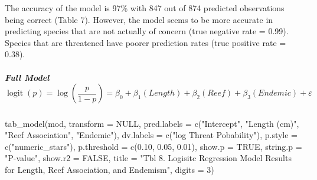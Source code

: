 \documentclass[
  letterpaper,
  DIV=11,
  numbers=noendperiod]{scrartcl}
\let\oldsubparagraph\subparagraph
\renewcommand{\subparagraph}[1]{\oldsubparagraph{#1}\mbox{}}
\newenvironment{Shaded}{\begin{snugshade}}{\end{snugshade}}
\newcommand{\AttributeTok}[1]{\textcolor[rgb]{0.40,0.45,0.13}{#1}}
\newcommand{\ConstantTok}[1]{\textcolor[rgb]{0.56,0.35,0.01}{#1}}
\newcommand{\DecValTok}[1]{\textcolor[rgb]{0.68,0.00,0.00}{#1}}
\newcommand{\FloatTok}[1]{\textcolor[rgb]{0.68,0.00,0.00}{#1}}
\newcommand{\FunctionTok}[1]{\textcolor[rgb]{0.28,0.35,0.67}{#1}}
\newcommand{\NormalTok}[1]{\textcolor[rgb]{0.00,0.23,0.31}{#1}}
\newcommand{\StringTok}[1]{\textcolor[rgb]{0.13,0.47,0.30}{#1}}
\begin{document}
The accuracy of the model is 97\% with 847 out of 874 predicted
observations being correct (Table 7). However, the model seems to be
more accurate in predicting species that are not actually of concern
(true negative rate = 0.99). Species that are threatened have poorer
prediction rates (true positive rate = 0.38).

\hypertarget{full-model-operatornamelogitplog-leftfracp1-prightbeta_0beta_1-length-beta_2-reef-beta_3-endemic-varepsilon}{%
\subparagraph{\texorpdfstring{\textbf{Full Model}
\[\operatorname{logit}(p)=\log \left(\frac{p}{1-p}\right)=\beta_0+\beta_1  (Length) + \beta_2  (Reef) + \beta_3  (Endemic) +\varepsilon \]}{Full Model \textbackslash operatorname\{logit\}(p)=\textbackslash log \textbackslash left(\textbackslash frac\{p\}\{1-p\}\textbackslash right)=\textbackslash beta\_0+\textbackslash beta\_1  (Length) + \textbackslash beta\_2  (Reef) + \textbackslash beta\_3  (Endemic) +\textbackslash varepsilon }}\label{full-model-operatornamelogitplog-leftfracp1-prightbeta_0beta_1-length-beta_2-reef-beta_3-endemic-varepsilon}}

\begin{Shaded}
\begin{Highlighting}[]
\FunctionTok{tab\_model}\NormalTok{(mod,}
          \AttributeTok{transform =} \ConstantTok{NULL}\NormalTok{,}
          \AttributeTok{pred.labels =} \FunctionTok{c}\NormalTok{(}\StringTok{"Intercept"}\NormalTok{, }\StringTok{"Length (cm)"}\NormalTok{, }
                          \StringTok{"Reef Association"}\NormalTok{, }\StringTok{"Endemic"}\NormalTok{),}
          \AttributeTok{dv.labels =} \FunctionTok{c}\NormalTok{(}\StringTok{"log Threat Pobability"}\NormalTok{),}
          \AttributeTok{p.style =} \FunctionTok{c}\NormalTok{(}\StringTok{"numeric\_stars"}\NormalTok{),}
          \AttributeTok{p.threshold =} \FunctionTok{c}\NormalTok{(}\FloatTok{0.10}\NormalTok{, }\FloatTok{0.05}\NormalTok{, }\FloatTok{0.01}\NormalTok{),}
          \AttributeTok{show.p =} \ConstantTok{TRUE}\NormalTok{,}
          \AttributeTok{string.p =} \StringTok{"P{-}value"}\NormalTok{,}
          \AttributeTok{show.r2 =} \ConstantTok{FALSE}\NormalTok{,}
          \AttributeTok{title =} \StringTok{"Tbl 8. Logisitc Regression Model Results for Length, Reef Association, and Endemism"}\NormalTok{,}
          \AttributeTok{digits =} \DecValTok{3}\NormalTok{)}
\end{Highlighting}
\end{Shaded}
\end{document}

